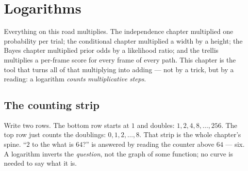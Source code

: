 \chapter{Logarithms}

\begin{narrative}
Everything on this road multiplies. The independence chapter multiplied
one probability per trial; the conditional chapter multiplied a width by
a height; the Bayes chapter multiplied prior odds by a likelihood
ratio; and the trellis multiplies a per-frame score for every frame of
every path. This chapter is the tool that turns all of that multiplying
into adding — not by a trick, but by a reading: a logarithm
\emph{counts multiplicative steps}.

\section{The counting strip}

Write two rows. The bottom row starts at $1$ and doubles:
$1, 2, 4, 8, \dots, 256$. The top row just counts the doublings:
$0, 1, 2, \dots, 8$. That strip is the whole chapter's spine. ``$2$ to
the what is $64$?'' is answered by reading the counter above $64$ —
six. A logarithm inverts the \emph{question}, not the graph of some
function; no curve is needed to say what it is.

\begin{center}
\end{center}


\end{narrative}

